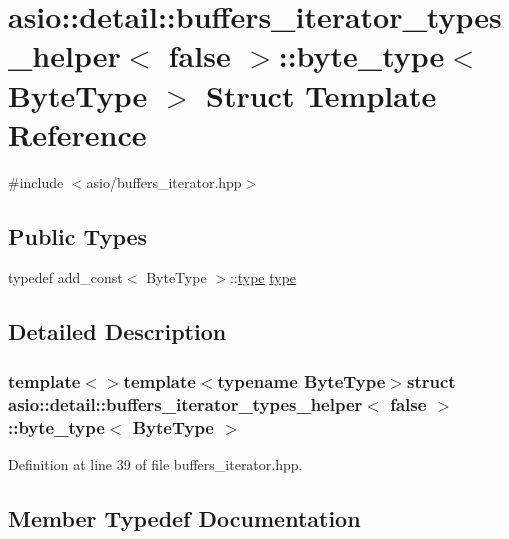 \hypertarget{structasio_1_1detail_1_1buffers__iterator__types__helper_3_01false_01_4_1_1byte__type}{}\section{asio\+:\+:detail\+:\+:buffers\+\_\+iterator\+\_\+types\+\_\+helper$<$ false $>$\+:\+:byte\+\_\+type$<$ Byte\+Type $>$ Struct Template Reference}
\label{structasio_1_1detail_1_1buffers__iterator__types__helper_3_01false_01_4_1_1byte__type}


{\ttfamily \#include $<$asio/buffers\+\_\+iterator.\+hpp$>$}

\subsection*{Public Types}
\begin{DoxyCompactItemize}
\item 
typedef add\+\_\+const$<$ Byte\+Type $>$\+::\hyperlink{structasio_1_1detail_1_1buffers__iterator__types__helper_3_01false_01_4_1_1byte__type_abb2587843440c828841ab928e6b319da}{type} \hyperlink{structasio_1_1detail_1_1buffers__iterator__types__helper_3_01false_01_4_1_1byte__type_abb2587843440c828841ab928e6b319da}{type}
\end{DoxyCompactItemize}


\subsection{Detailed Description}
\subsubsection*{template$<$$>$template$<$typename Byte\+Type$>$struct asio\+::detail\+::buffers\+\_\+iterator\+\_\+types\+\_\+helper$<$ false $>$\+::byte\+\_\+type$<$ Byte\+Type $>$}



Definition at line 39 of file buffers\+\_\+iterator.\+hpp.



\subsection{Member Typedef Documentation}
\hypertarget{structasio_1_1detail_1_1buffers__iterator__types__helper_3_01false_01_4_1_1byte__type_abb2587843440c828841ab928e6b319da}{}
